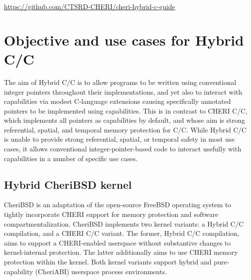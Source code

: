 \documentclass[12pt,twoside,openright,a4paper]{article}
\newcommand{\note}[2]{{\color{blue}[ Note: #1 - #2]}}
\renewcommand{\note}[2]{\relax\ifhmode\unskip\fi}
\newcommand{\psnote}[1]{\note{#1}{Peter S.}}
\newcommand*{\cpp}{\texorpdfstring{C\textsmaller[2]{\protect\nolinebreak[4]\hspace{-.05em}\raisebox{.45ex}{\textbf{++}}}}{C++}}
\newcommand*{\COrCpp}{C/\cpp{}}
\newcommand*{\purecapCOrCpp}{CHERI \COrCpp{}}
\newcommand*{\hybridCOrCpp}{Hybrid \COrCpp{}}
\begin{document}
\smallskip

\url{https://github.com/CTSRD-CHERI/cheri-hybrid-c-guide}

\section{Objective and use cases for \hybridCOrCpp{}}

\psnote{somewhere early on, maybe here, this document should be saying what code has been ported to (or implemented from scratch) in Hybrid}

The aim of \hybridCOrCpp{} is to allow programs to be written using
conventional integer pointers throughout their implementations, and yet also
to interact with capabilities via modest C-language extensions causing
specifically annotated pointers to be implemented using capabilities.
This is in contrast to \purecapCOrCpp{}, which implements all pointers as
capabilities by default, and whose aim is strong referential, spatial, and
temporal memory protection for C/\cpp{}.
\psnote{including ``temporal'' there, unqualified, is going to be confusing.  Suggest splitting the sentence up and describing more explicitly what the current state and plausible options are w.r.t. temporal}
While \hybridCOrCpp{} is unable to provide strong referential, spatial, or
temporal safety in most use cases, it allows conventional
integer-pointer-based code to interact usefully with capabilities in a number
of specific use cases.
\psnote{that seems to underplay what one can get from hybrid -- surely one can say something about ``specific protections'' or ``protection in specific ways'' or something?}

\subsection{Hybrid CheriBSD kernel}

CheriBSD is an adaptation of the open-source FreeBSD operating system to
tightly incorporate CHERI support for memory protection and software
compartmentalization.
CheriBSD implements two kernel variants: a \hybridCOrCpp{} compilation, and a
\purecapCOrCpp{} variant.
The former, \hybridCOrCpp{} compilation, aims to support a CHERI-enabled userspace
without substantive changes to kernel-internal protection.
The latter additionally aims to use CHERI memory protection within the
kernel.
\psnote{say explicitly that we don't discuss the latter further here?  Otherwise it's confusing to set up the opposition but then only talk about the former below}
Both kernel variants support hybrid and pure-capability (CheriABI) userspace
process environments.
\end{document}
